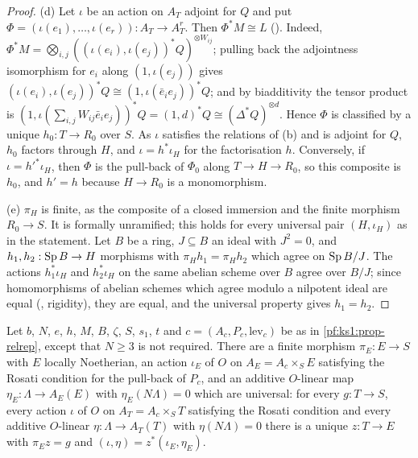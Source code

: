 \begin{proof}
(d) Let $\iota$ be an action on $A_T$ adjoint for $Q$ and put $\Phi=(\iota(e_1),\dots,\iota(e_r)):A_T\to A_T^r$. Then $\Phi^*M\cong L$
(). Indeed,
$\Phi^*M=\bigotimes_{i,j}((\iota(e_i),\iota(e_j))^*Q)^{\otimes W_{ij}}$; pulling back the adjointness isomorphism for $e_i$ along $(1,\iota(e_j))$
gives $(\iota(e_i),\iota(e_j))^*Q\cong(1,\iota(\bar e_ie_j))^*Q$; and by biadditivity the tensor product is
$(1,\iota(\sum_{i,j}W_{ij}\bar e_ie_j))^*Q=(1,d)^*Q\cong(\Delta^*Q)^{\otimes d}$. Hence $\Phi$ is classified by a unique $h_0:T\to R_0$ over $S$. As
$\iota$ satisfies the relations of (b) and is adjoint for $Q$, $h_0$ factors through $H$, and $\iota=h^*\iota_H$ for the factorisation $h$.
Conversely, if $\iota=h'^*\iota_H$, then $\Phi$ is the pull-back of $\Phi_0$ along $T\to H\to R_0$, so this composite is $h_0$, and $h'=h$
because $H\to R_0$ is a monomorphism.

(e) $\pi_H$ is finite, as the composite of a closed immersion and the finite morphism $R_0\to S$. It is formally unramified; this holds for
every universal pair $(H,\iota_H)$ as in the statement. Let $B$ be a ring, $J\subseteq B$ an ideal with $J^2=0$, and $h_1,h_2:\operatorname{Sp} B\to H$
morphisms with $\pi_Hh_1=\pi_Hh_2$ which agree on $\operatorname{Sp} B/J$. The actions $h_1^*\iota_H$ and $h_2^*\iota_H$ on the same abelian scheme over
$B$ agree over $B/J$; since homomorphisms of abelian schemes which agree modulo a nilpotent ideal are equal
(, rigidity), they are equal, and the universal property gives $h_1=h_2$.
\end{proof}

\begin{proposition}\label{pf:ks1:prop-actlev}
Let $b$, $N$, $e$, $h$, $M$, $B$, $\zeta$, $S$, $s_1$, $t$ and $c=(A_c,P_c,\mathrm{lev}_c)$ be as in \cref{pf:ks1:prop-relrep}, except that $N\ge3$ is
not required. There are a finite morphism $\pi_E:E\to S$ with $E$ locally Noetherian, an action $\iota_E$ of $O$ on $A_E=A_c\times_SE$ satisfying
the Rosati condition for the pull-back of $P_c$, and an additive $O$-linear map $\eta_E:\Lambda\to A_E(E)$ with $\eta_E(N\Lambda)=0$ which are
universal: for every $g:T\to S$, every action $\iota$ of $O$ on $A_T=A_c\times_ST$ satisfying the Rosati condition and every additive $O$-linear
$\eta:\Lambda\to A_T(T)$ with $\eta(N\Lambda)=0$ there is a unique $z:T\to E$ with $\pi_Ez=g$ and $(\iota,\eta)=z^*(\iota_E,\eta_E)$.
\end{proposition}

